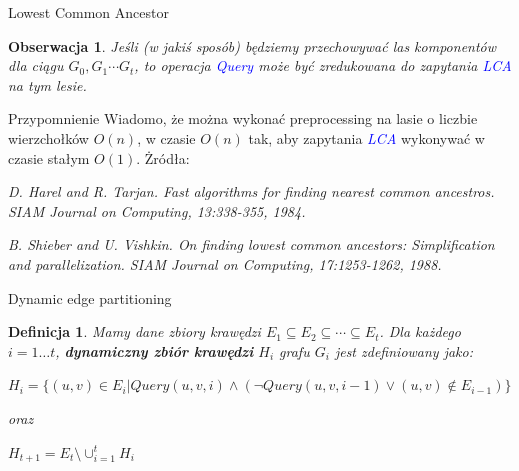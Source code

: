 \documentclass{beamer}
\newtheorem{df}{Definicja}
\newtheorem{obs}{Obserwacja}
\newcommand{\emp}[1]{\textcolor{blue}{\textit{#1}}}
\begin{document}
\begin{frame}{Lowest Common Ancestor}
\begin{obs}
Jeśli (w jakiś sposób) będziemy przechowywać las komponentów dla ciągu $G_0,G_1 \cdots G_t$, to operacja \emp{Query} może być zredukowana do zapytania \emp{LCA} na tym lesie.
\end{obs}

\begin{block}{Przypomnienie}
Wiadomo, że można wykonać preprocessing na lasie o liczbie wierzchołków \alert{$O(n)$}, w czasie \alert{$O(n)$} tak, aby zapytania \emp{LCA} wykonywać w czasie stałym \alert{$O(1)$}. Żródła:

\vspace{0.1cm}
{\small\textit{D. Harel and R. Tarjan. Fast algorithms for finding nearest common ancestros. SIAM Journal on Computing, 13:338-355, 1984.}}

\vspace{0.1cm}
{\small\textit{B. Shieber and U. Vishkin. On finding lowest common ancestors: Simplification and parallelization. SIAM Journal on Computing, 17:1253-1262, 1988.}}
\end{block}
\end{frame}

\begin{frame}{Dynamic edge partitioning}
\begin{df}
Mamy dane zbiory krawędzi $E_1 \subseteq E_2 \subseteq \cdots \subseteq E_t$. Dla każdego $i=1\dots t$, \textbf{dynamiczny zbiór krawędzi} $H_i$ grafu $G_i$ jest zdefiniowany jako:

\vspace{0.4cm}
{\small $H_i = \{(u,v)\in E_i | Query(u,v,i) \wedge (\neg Query(u,v,i-1) \vee (u,v) \notin E_{i-1})\}$}

\vspace{0.4cm}
oraz

\vspace{0.4cm}
{\small $H_{t+1} = E_t \setminus \cup^t_{i=1}H_i$}

\end{df}
\end{frame}
\end{document}
